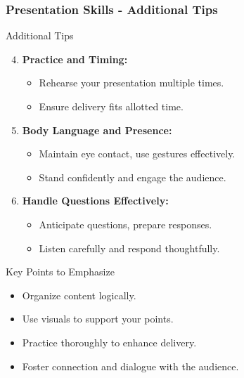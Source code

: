 \documentclass[aspectratio=169]{beamer}
\begin{document}
\begin{frame}[fragile]
  \frametitle{Presentation Skills - Additional Tips}
  \begin{block}{Additional Tips}
    \begin{enumerate}
      \setcounter{enumi}{3} %
      \item \textbf{Practice and Timing:}
      \begin{itemize}
        \item Rehearse your presentation multiple times.
        \item Ensure delivery fits allotted time.
      \end{itemize}
      
      \item \textbf{Body Language and Presence:}
      \begin{itemize}
        \item Maintain eye contact, use gestures effectively.
        \item Stand confidently and engage the audience.
      \end{itemize}

      \item \textbf{Handle Questions Effectively:}
      \begin{itemize}
        \item Anticipate questions, prepare responses.
        \item Listen carefully and respond thoughtfully.
      \end{itemize}
    \end{enumerate}
  \end{block}
  
  \begin{block}{Key Points to Emphasize}
    \begin{itemize}
      \item Organize content logically.
      \item Use visuals to support your points.
      \item Practice thoroughly to enhance delivery.
      \item Foster connection and dialogue with the audience.
    \end{itemize}
  \end{block}
\end{frame}
\end{document}
